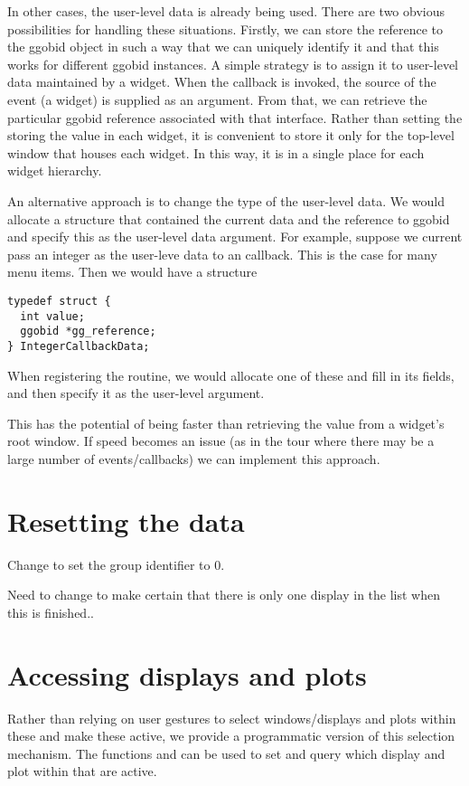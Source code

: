 \documentclass{article}
\begin{document}
In other cases, the user-level data is already being used.  There are
two obvious possibilities for handling these situations.  Firstly, we
can store the reference to the ggobid object in such a way that we can
uniquely identify it and that this works for different ggobid
instances. A simple strategy is to assign it to user-level data
maintained by a widget.  When the callback is invoked, the source of
the event (a widget) is supplied as an argument. From that, we can
retrieve the particular ggobid reference associated with that
interface. Rather than setting the storing the value in each widget,
it is convenient to store it only for the top-level window that houses
each widget. In this way, it is in a single place for each widget
hierarchy.

An alternative approach is to change the type of the user-level data.
We would allocate a structure that contained the current data and the
reference to ggobid and specify this as the user-level data argument.
For example, suppose we current pass an integer as the user-leve data
to an callback. This is the case for many menu items.  Then we would
have a structure
\begin{verbatim}
typedef struct {
  int value;
  ggobid *gg_reference;
} IntegerCallbackData;
\end{verbatim}
When registering the routine, we would allocate one of these and
fill in its fields, and then specify it as the user-level argument.


This has the potential of being faster than retrieving the value from
a widget's root window. If speed becomes an issue (as in the tour
where there may be a large number of events/callbacks) we can
implement this approach.



\section{Resetting the data}

Change  to set the group identifier to 0.


Need to change  to make certain that there is only
one display in the list when this is finished..



\section{Accessing displays and plots}
Rather than relying on user gestures to select windows/displays and
plots within these and make these active, we provide a programmatic
version of this selection mechanism.  The functions
 and  can be used to
set and query which display and plot within that are active.
\end{document}
